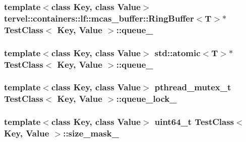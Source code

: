 \subsubsection[{queue\+\_\+}]{\setlength{\rightskip}{0pt plus 5cm}template$<$class Key, class Value$>$ {\bf tervel\+::containers\+::lf\+::mcas\+\_\+buffer\+::\+Ring\+Buffer}$<$T$>$$\ast$ {\bf Test\+Class}$<$ Key, {\bf Value} $>$\+::queue\+\_\+\hspace{0.3cm}{\ttfamily [private]}}\label{class_test_class_a58c609d2496e3e96bf13fa26d9697c6c}
\hypertarget{class_test_class_a25fdd248a90a1027d4f9dec63f7b2328}{}
\subsubsection[{queue\+\_\+}]{\setlength{\rightskip}{0pt plus 5cm}template$<$class Key, class Value$>$ std\+::atomic$<$T$>$$\ast$ {\bf Test\+Class}$<$ Key, {\bf Value} $>$\+::queue\+\_\+\hspace{0.3cm}{\ttfamily [private]}}\label{class_test_class_a25fdd248a90a1027d4f9dec63f7b2328}
\hypertarget{class_test_class_aed0b5ac583a2f0c4405ea66e5e4835c6}{}
\subsubsection[{queue\+\_\+lock\+\_\+}]{\setlength{\rightskip}{0pt plus 5cm}template$<$class Key, class Value$>$ pthread\+\_\+mutex\+\_\+t {\bf Test\+Class}$<$ Key, {\bf Value} $>$\+::queue\+\_\+lock\+\_\+\hspace{0.3cm}{\ttfamily [private]}}\label{class_test_class_aed0b5ac583a2f0c4405ea66e5e4835c6}
\hypertarget{class_test_class_af2429ac335c40b2244dcf1c0d27aa3e7}{}
\subsubsection[{size\+\_\+mask\+\_\+}]{\setlength{\rightskip}{0pt plus 5cm}template$<$class Key, class Value$>$ uint64\+\_\+t {\bf Test\+Class}$<$ Key, {\bf Value} $>$\+::size\+\_\+mask\+\_\+\hspace{0.3cm}{\ttfamily [private]}}\label{class_test_class_af2429ac335c40b2244dcf1c0d27aa3e7}
\hypertarget{class_test_class_a4d2c82c8499f514936f1262c684075aa}{}
